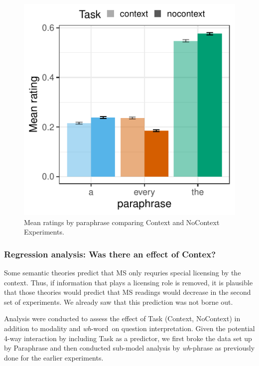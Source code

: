 \documentclass[12pt,letterpaper,table,svgnames,dvipsnames]{article}
\newcommand{\figref}[1]{Fig.~\ref{#1}}
\newcommand{\whw}{\emph{wh}-word~}
\begin{document}
\begin{figure}[h!]
\centering
\centering
\includegraphics[scale=1]{figures/overall_Task.pdf}
\caption{Mean ratings by paraphrase comparing Context and NoContext Experiments.}
\label{Task_overall}
\end{figure}



\subsubsection{Regression analysis: Was there an effect of Contex?}
Some semantic theories predict that MS only requries special licensing by the context. Thus, if information that plays a licensing role is removed, it is plausible that those theories would predict that MS readings would decrease in the second set of experiments. We already saw that this prediction was not borne out. 

Analysis were conducted to assess the effect of Task (Context, NoContext) in addition to modality and \whw on question interpretation. Given the potential 4-way interaction by including Task as a predictor, we first broke the data set up by Paraphrase and then conducted sub-model analysis by \emph{wh}-phrase as previously done for the earlier experiments.
\end{document}

